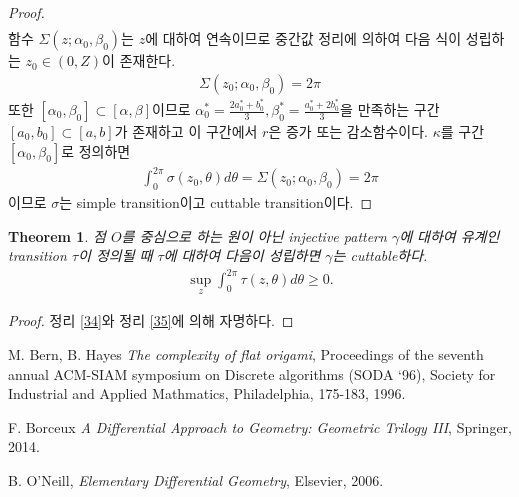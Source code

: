 \documentclass{amsart}
\theoremstyle{plain}
\newtheorem{theorem}{Theorem}[section]
\theoremstyle{definition}
\theoremstyle{remark}
\begin{document}
\begin{proof}
\begin{align*}
\end{align*}
함수 $\Sigma(z;\alpha_0,\beta_0)$는 $z$에 대하여 연속이므로 중간값 정리에 의하여 다음 식이 성립하는 $z_0\in(0,Z)$이 존재한다.
\begin{align*}
\Sigma(z_0;\alpha_0,\beta_0)=2\pi
\end{align*}
또한 $[\alpha_0,\beta_0]\subset[\alpha,\beta]$이므로 $\alpha_0^*=\frac{2a_0^*+b_0^*}3, \beta_0^*=\frac{a_0^*+2b_0^*}3$을 만족하는 구간 $[a_0,b_0]\subset[a,b]$가 존재하고 이 구간에서 $r$은 증가 또는 감소함수이다.
$\kappa$를 구간 $[\alpha_0,\beta_0]$로 정의하면
\begin{align*}
\int_0^{2\pi}\sigma(z_0,\theta)d\theta=\Sigma(z_0;\alpha_0,\beta_0)=2\pi
\end{align*}
이므로 $\sigma$는 simple transition이고 cuttable transition이다.
\end{proof}

\begin{theorem}\label{36}%
점 $O$를 중심으로 하는 원이 아닌 injective pattern $\gamma$에 대하여 유계인 transition $\tau$이 정의될 때 $\tau$에 대하여 다음이 성립하면 $\gamma$는 cuttable하다.
\begin{align*}
\sup_z\int_0^{2\pi}\tau(z,\theta)d\theta\ge0.
\end{align*}
\end{theorem}

\begin{proof}
정리 \ref{34}와 정리 \ref{35}에 의해 자명하다.
\end{proof}






\iffalse
\section{Continuous distribution of Cutting}

커팅들의 집합을 잘 정의해야 되는데...

(정리)제트제로에 대한 커터블 트랜지션이 존재하면
 제트제로보다 작은 모든 제트에 대해서도 커터블 트랜지션존재


\fi





\begin{thebibliography}{99}

 M. Bern, B. Hayes {\it The complexity of flat origami}, Proceedings of the seventh annual ACM-SIAM symposium on Discrete algorithms (SODA `96), Society for Industrial and Applied Mathmatics, Philadelphia, 175-183, 1996.

 F. Borceux {\it A Differential Approach to Geometry: Geometric Trilogy III}, Springer, 2014.

 B. O'Neill, {\it Elementary Differential Geometry}, Elsevier, 2006.

\end{thebibliography}
\end{document}
